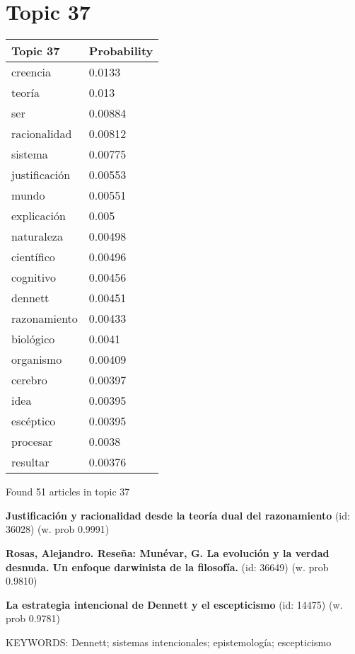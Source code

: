 \documentclass{article}
\begin{document}
\vfill
\newpage


\centering
\thispagestyle{empty}
\section*{Topic 37}\vfill
\begin{tabular}{ll}
\toprule
      Topic 37 & Probability \\
\midrule
      creencia &      0.0133 \\
        teoría &       0.013 \\
           ser &     0.00884 \\
  racionalidad &     0.00812 \\
       sistema &     0.00775 \\
 justificación &     0.00553 \\
         mundo &     0.00551 \\
   explicación &       0.005 \\
    naturaleza &     0.00498 \\
    científico &     0.00496 \\
     cognitivo &     0.00456 \\
       dennett &     0.00451 \\
  razonamiento &     0.00433 \\
     biológico &      0.0041 \\
     organismo &     0.00409 \\
       cerebro &     0.00397 \\
          idea &     0.00395 \\
     escéptico &     0.00395 \\
      procesar &      0.0038 \\
      resultar &     0.00376 \\
\bottomrule
\end{tabular}

\vfill
Found 51 articles in topic 37
\vfill

\textbf{Justificación y racionalidad desde la teoría dual del razonamiento} (id: 36028)
 (w. prob 0.9991)
\vfill

\textbf{Rosas, Alejandro. Reseña: Munévar, G. La evolución y la verdad desnuda. Un enfoque darwinista de la filosofía.} (id: 36649)
 (w. prob 0.9810)
\vfill

\textbf{La estrategia intencional de Dennett y el escepticismo} (id: 14475)
 (w. prob 0.9781)


KEYWORDS:
Dennett; sistemas intencionales; epistemología; escepticismo
\end{document}
